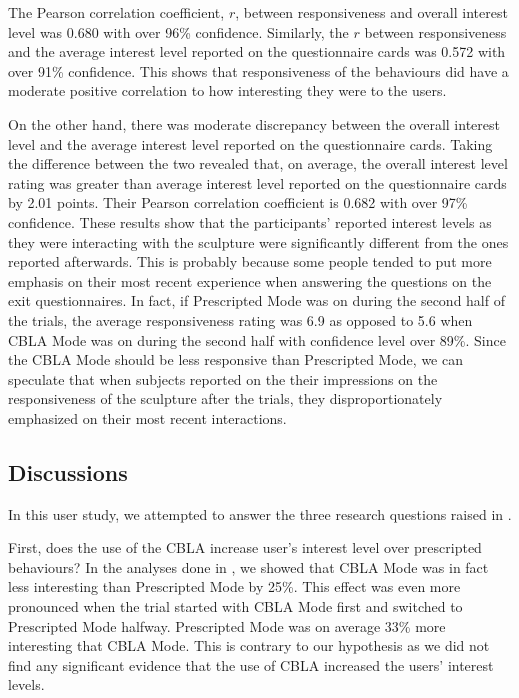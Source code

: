 The Pearson correlation coefficient, $r$, between responsiveness and overall interest level was 0.680 with over 96\% confidence. Similarly, the $r$ between responsiveness and the average interest level reported on the questionnaire cards was 0.572 with over 91\% confidence. This shows that responsiveness of the behaviours did have a moderate positive correlation to how interesting they were to the users.

On the other hand, there was moderate discrepancy between the overall interest level and the average interest level reported on the questionnaire cards. Taking the difference between the two revealed that, on average, the overall interest level rating was greater than average interest level reported on the questionnaire cards by 2.01 points. Their Pearson correlation coefficient is 0.682 with over 97\% confidence. These results show that the participants' reported interest levels as they were interacting with the sculpture were significantly different from the ones reported afterwards. This is probably because some people tended to put more emphasis on their most recent experience when answering the questions on the exit questionnaires. In fact, if Prescripted Mode was on during the second half of the trials, the average responsiveness rating was 6.9 as opposed to 5.6 when CBLA Mode was on during the second half with confidence level over 89\%. Since the CBLA Mode should be less responsive than Prescripted Mode, we can speculate that when subjects reported on the their impressions on the responsiveness of the sculpture after the trials, they disproportionately emphasized on their most recent interactions.



\subsection{Discussions}

In this user study, we attempted to answer the three research questions raised in . 

First,  does the use of the CBLA increase user's interest level over prescripted behaviours?  In the analyses done in , we showed that CBLA Mode was in fact less interesting than Prescripted Mode by 25\%. This effect was even more pronounced when the trial started with CBLA Mode first and switched to Prescripted Mode halfway. Prescripted Mode was on average 33\% more interesting that CBLA Mode. This is contrary to our hypothesis as we did not find any significant evidence that the use of CBLA increased the users' interest levels. 

